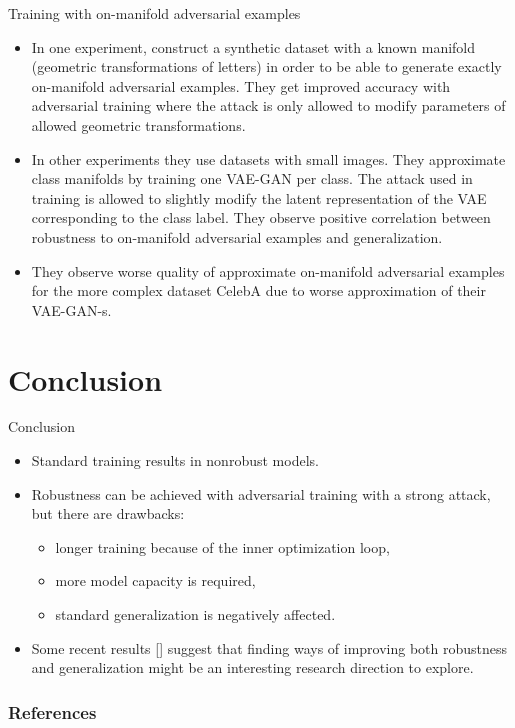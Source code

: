\documentclass{beamer}
\newcommand{\citet}[1]{{\color{citecolor}\relscale{0.8}\textcite{#1}}}
\newcommand{\citep}[1]{{\color{citecolor}\relscale{0.8}[\textcite{#1}]}}
\begin{document}
\begin{frame}[allowframebreaks=0.9]{Training with on-manifold adversarial examples}
\begin{itemize}
		\item In one experiment, \citet{Stutz:2018:DARG} construct a synthetic dataset with a known manifold (geometric transformations of letters) in order to be able to generate exactly on-manifold adversarial examples. They get improved accuracy with adversarial training where the attack is only allowed to modify parameters of allowed geometric transformations.
		
		\item In other experiments they use 
		datasets with small images. They approximate class manifolds by training one VAE-GAN per class. The attack used in training is allowed to slightly modify the latent representation of the VAE corresponding to the class label. They observe positive correlation between robustness to on-manifold adversarial examples and generalization. 
		\item They observe worse quality of approximate on-manifold adversarial examples for the more complex dataset CelebA due to worse approximation of their VAE-GAN-s.
	\end{itemize}
\end{frame}

\section{Conclusion} \label{sec:conclusion}

\begin{frame}[allowframebreaks=0.9]{Conclusion}
	\begin{itemize}
		\item Standard training results in nonrobust models.
		\item Robustness can be achieved with adversarial training with a strong attack, but there are drawbacks:
		\begin{itemize}
			\item longer training because of the inner optimization loop,
			\item more model capacity is required,
			\item standard generalization is negatively affected.
		\end{itemize}
		\item Some recent results \citep{Stutz:2018:DARG} suggest that finding ways of improving both robustness and generalization might be an interesting research direction to explore.
	\end{itemize}
\end{frame}

\begin{frame}[allowframebreaks=0.9]
	\frametitle{References}
	{\printbibliography}
\end{frame}

\appendix

\appendsubframes
\end{document}
